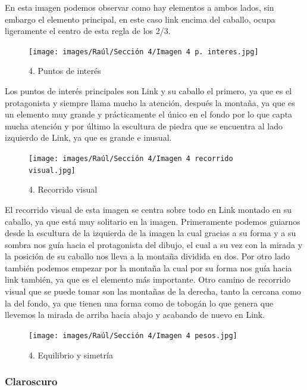 \documentclass[12pt]{article}
\begin{document}
En esta imagen podemos observar como hay elementos a ambos lados, sin embargo el elemento principal, en este caso link encima del caballo, ocupa ligeramente el centro de esta regla de los 2/3.

\begin{figure}[H]
      \centering
      \texttt{[image: images/Raúl/Sección 4/Imagen 4 p. interes.jpg]}
      \caption{\small 4. Puntos de interés}
\end{figure}  

Los puntos de interés principales son Link y su caballo el primero, ya que es el protagonista y siempre llama mucho la atención, después la montaña, ya que es un elemento muy grande y prácticamente el único en el fondo por lo que capta mucha atención y por último la escultura de piedra que se encuentra al lado izquierdo de Link, ya que es grande e inusual.

\begin{figure}[H]
      \centering
      \texttt{[image: images/Raúl/Sección 4/Imagen 4 recorrido visual.jpg]}
      \caption{\small 4. Recorrido visual}
\end{figure}  

El recorrido visual de esta imagen se centra sobre todo en Link montado en su caballo, ya que está muy solitario en la imagen. Primeramente podemos guiarnos desde la escultura de la izquierda de la imagen la cual gracias a su forma y a su sombra nos guía hacia el protagonista del dibujo, el cual a su vez con la mirada y la posición de su caballo nos lleva a la montaña dividida en dos. Por otro lado también podemos empezar por la montaña la cual por su forma nos guía hacia link también, ya que es el elemento más importante. Otro camino de recorrido visual que se puede tomar son las montañas de la derecha, tanto la cercana como la del fondo, ya que tienen una forma como de tobogán lo que genera que llevemos la mirada de arriba hacia abajo y acabando de nuevo en Link.

\begin{figure}[H]
      \centering
      \texttt{[image: images/Raúl/Sección 4/Imagen 4 pesos.jpg]}
      \caption{\small 4. Equilibrio y simetría}
\end{figure} 

        \subsubsection{Claroscuro}
\end{document}
